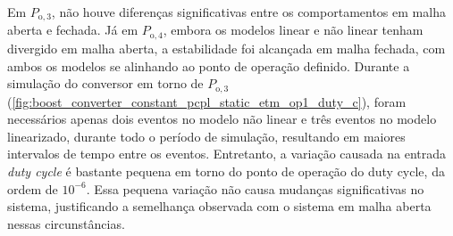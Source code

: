 Em $P_{\mathrm{o}, 3}$, não houve diferenças significativas entre os comportamentos em malha aberta e fechada. Já em $P_{\mathrm{o}, 4}$, embora os modelos linear e não linear tenham divergido em malha aberta, a estabilidade foi alcançada em malha fechada, com ambos os modelos se alinhando ao ponto de operação definido. Durante a simulação do conversor em torno de $P_{\mathrm{o}, 3}$ (\autoref{fig:boost_converter_constant_pcpl_static_etm_op1_duty_c}), foram necessários apenas dois eventos no modelo não linear e três eventos no modelo linearizado, durante todo o período de simulação, resultando em maiores intervalos de tempo entre os eventos. Entretanto, a variação causada na entrada \textit{duty cycle} é bastante pequena em torno do ponto de operação do duty cycle, da ordem de $10^{-6}$. Essa pequena variação não causa mudanças significativas no sistema, justificando a semelhança observada com o sistema em malha aberta nessas circunstâncias.

